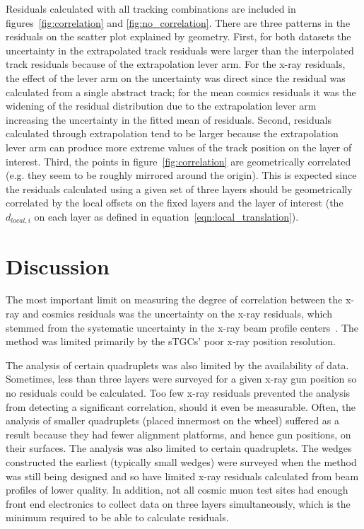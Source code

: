 Residuals calculated with all tracking combinations are included in figures~\ref{fig:correlation} and \ref{fig:no_correlation}. There are three patterns in the residuals on the scatter plot explained by geometry. First, for both datasets the uncertainty in the extrapolated track residuals were larger than the interpolated track residuals because of the extrapolation lever arm. For the x-ray residuals, the effect of the lever arm on the uncertainty was direct since the residual was calculated from a single abstract track; for the mean cosmics residuals it was the widening of the residual distribution due to the extrapolation lever arm increasing the uncertainty in the fitted mean of residuals. Second, residuals calculated through extrapolation tend to be larger because the extrapolation lever arm can produce more extreme values of the track position on the layer of interest. Third, the points in figure~\ref{fig:correlation} are geometrically correlated (e.g. they seem to be roughly mirrored around the origin). This is expected since the residuals calculated using a given set of three layers should be geometrically correlated by the local offsets on the fixed layers and the layer of interest (the $d_{local, i}$ on each layer as defined in equation~\ref{eqn:local_translation}). 

\section{Discussion}
The most important limit on measuring the degree of correlation between the x-ray and cosmics residuals was the uncertainty on the x-ray residuals, which stemmed from the systematic uncertainty in the x-ray beam profile centers~\cite{lefebvre_precision_2020}. The method was limited primarily by the sTGCs' poor x-ray position resolution.

The analysis of certain quadruplets was also limited by the availability of data. Sometimes, less than three layers were surveyed for a given x-ray gun position so no residuals could be calculated. Too few x-ray residuals prevented the analysis from detecting a significant correlation, should it even be measurable. Often, the analysis of smaller quadruplets (placed innermost on the wheel) suffered as a result because they had fewer alignment platforms, and hence gun positions, on their surfaces. The analysis was also limited to certain quadruplets. The wedges constructed the earliest (typically small wedges) were surveyed when the method was still being designed and so have limited x-ray residuals calculated from beam profiles of lower quality. In addition, not all cosmic muon test sites had enough front end electronics to collect data on three layers simultaneously, which is the minimum required to be able to calculate residuals.

